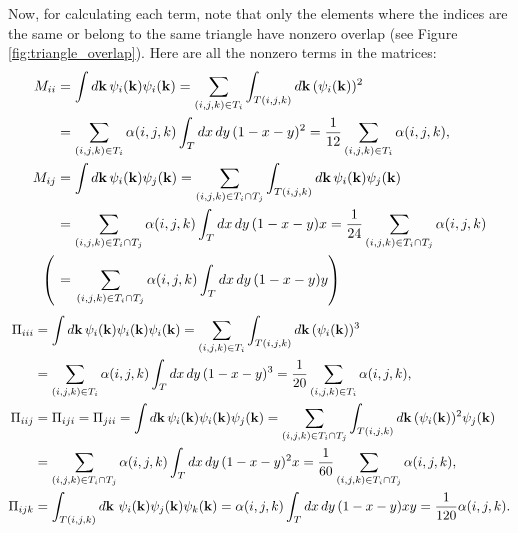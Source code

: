 \documentclass[12pt]{article}
\begin{document}
Now, for calculating each term, note that only the elements where the indices are the same or belong
to the same triangle have nonzero overlap (see Figure \ref{fig:triangle_overlap}). Here are all the
nonzero terms in the matrices:
\begin{align}
M_{ii} &= \int\dd{\vb{k}}\psi_i(\vb{k})\psi_i(\vb{k})
    = \sum_{(i,j,k) \in T_i} \int_{T(i,j,k)} \dd{\vb{k}} (\psi_i(\vb{k}))^2 \\
    &= \sum_{(i,j,k) \in T_i} \alpha(i,j,k) \int_T \dd{x} \dd{y} (1 - x - y)^2
    = \frac{1}{12} \sum_{(i,j,k) \in T_i} \alpha(i,j,k), \notag \\
M_{ij} &= \int\dd{\vb{k}}\psi_i(\vb{k})\psi_j(\vb{k})
    = \sum_{(i,j,k) \in T_i \cap T_j} \int_{T(i,j,k)} \dd{\vb{k}} \psi_i(\vb{k}) \psi_j(\vb{k}) \\
    &= \sum_{(i,j,k) \in T_i \cap T_j} \alpha(i,j,k) \int_T \dd{x} \dd{y} (1 - x - y)x
    = \frac{1}{24} \sum_{(i,j,k) \in T_i \cap T_j} \alpha(i,j,k) \notag \\
    \left(\vphantom{\sum_{(i)}}\right. &=\left.\sum_{(i,j,k) \in T_i \cap T_j}
    \alpha(i,j,k) \int_T \dd{x} \dd{y} (1 - x - y)y \right) \notag
\end{align}
\begin{align}
\Pi_{iii} &= \int\dd{\vb{k}}\psi_i(\vb{k})\psi_i(\vb{k})\psi_i(\vb{k})
    = \sum_{(i,j,k) \in T_i} \int_{T(i,j,k)} \dd{\vb{k}} (\psi_i(\vb{k}))^3 \\
    &= \sum_{(i,j,k) \in T_i} \alpha(i,j,k) \int_T \dd{x} \dd{y} (1 - x - y)^3
    = \frac{1}{20} \sum_{(i,j,k) \in T_i} \alpha(i,j,k), \notag \\
\Pi_{iij} &= \Pi_{iji} = \Pi_{jii} = \int\dd{\vb{k}}\psi_i(\vb{k})\psi_i(\vb{k})\psi_j(\vb{k})
    = \sum_{(i,j,k) \in T_i \cap T_j} \int_{T(i,j,k)} \dd{\vb{k}}
        (\psi_i(\vb{k}))^2 \psi_j(\vb{k}) \\
    &= \sum_{(i,j,k) \in T_i \cap T_j} \alpha(i,j,k) \int_T \dd{x} \dd{y} (1 - x - y)^2 x
    = \frac{1}{60} \sum_{(i,j,k) \in T_i \cap T_j} \alpha(i,j,k), \notag\\
\Pi_{ijk} &= \int_{T(i,j,k)} \dd{\vb{k}}\, \psi_i(\vb{k}) \psi_j(\vb{k}) \psi_k(\vb{k})
= \alpha(i,j,k) \int_T \dd{x} \dd{y} (1 - x - y)xy = \frac{1}{120} \alpha(i,j,k).
\end{align}
\end{document}
